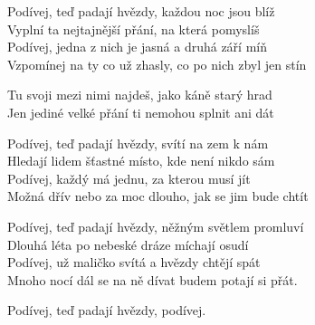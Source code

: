 
\ve
Podívej, teď padají hvězdy, každou noc jsou blíž\\
Vyplní ta nejtajnější přání, na která pomyslíš\\
Podívej, jedna z nich je jasná a druhá září míň\\
Vzpomínej na ty co už zhasly, co po nich zbyl jen stín

\cho{}
Tu svoji mezi nimi najdeš, jako káně starý hrad\\
Jen jediné velké přání ti nemohou splnit ani dát

\ve{}
Podívej, teď padají hvězdy, svítí na zem k nám\\
Hledají lidem šťastné místo, kde není nikdo sám\\
Podívej, každý má jednu, za kterou musí jít\\
Možná dřív nebo za moc dlouho, jak se jim bude chtít

\cho{}

\ve{}
Podívej, teď padají hvězdy, něžným světlem promluví\\
Dlouhá léta po nebeské dráze míchají osudí\\
Podívej, už maličko svítá a hvězdy chtějí spát\\
Mnoho nocí dál se na ně dívat budem potají si přát.

\cho{}
\re{+ }
Podívej, teď padají hvězdy, podívej.


\esong
